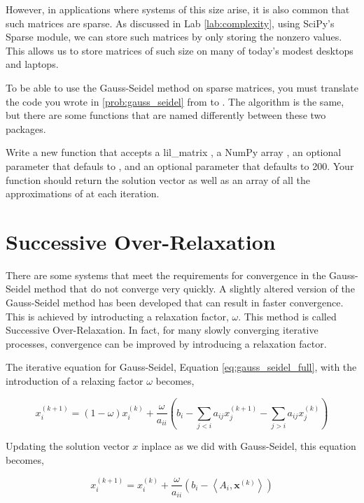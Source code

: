 However, in applications where systems of this size arise, it is also common that such matrices are sparse. As discussed in Lab \ref{lab:complexity}, using SciPy's Sparse module, we can store such matrices by only storing the nonzero values. This allows us to store matrices of such size on many of today's modest desktops and laptops.

\begin{problem}
To be able to use the Gauss-Seidel method on sparse matrices, you must translate the code you wrote in \ref{prob:gauss_seidel} from  to . The algorithm is the same, but there are some functions that are named differently between these two packages.

Write a new function that accepts a lil\_matrix , a NumPy array , an optional parameter  that defauls to , and an optional parameter  that defaults to 200. Your function should return the solution vector  as well as an array of all the approximations of  at each iteration.
\end{problem}

\section*{Successive Over-Relaxation}
There are some systems that meet the requirements for convergence in the Gauss-Seidel method that do not converge very quickly. A slightly altered version of the Gauss-Seidel method has been developed that can result in faster convergence. This is achieved by introducting a relaxation factor, $\omega$. This method is called Successive Over-Relaxation. In fact, for many slowly converging iterative processes, convergence can be improved by introducing a relaxation factor.

The iterative equation for Gauss-Seidel, Equation \ref{eq:gauss_seidel_full}, with the introduction of a relaxing factor $\omega$ becomes,

$$
x_i^{(k+1)} = (1 - \omega)x_i^{(k)} + \frac{\omega}{a_{ii}} \left (b_i - \sum_{j < i}a_{ij}x^{(k+1)}_j - \sum_{j > i}a_{ij}x^{(k)}_j \right )
$$

Updating the solution vector $x$ inplace as we did with Gauss-Seidel, this equation becomes,

\begin{equation} \label{eq:sor}
x^{(k+1)}_i = x^{(k)}_i + \frac{\omega}{a_{ii}} \left ( b_i - \left < A_i, \mathbf{x}^{(k)} \right > \right )
\end{equation}

